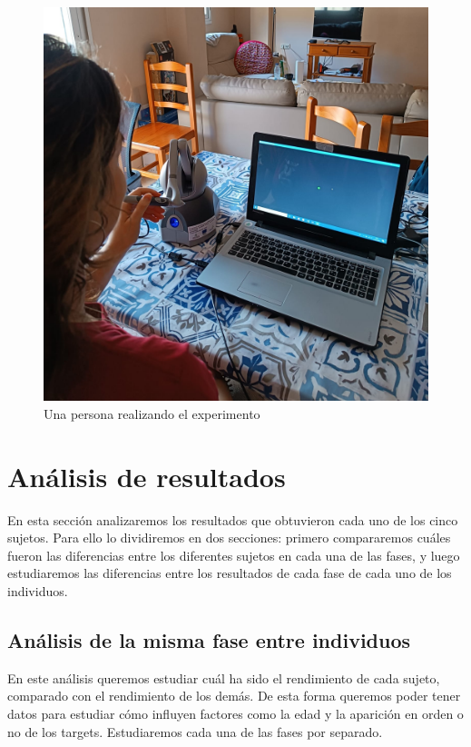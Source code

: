 \documentclass[a4paper,11pt, oneside]{book}
\begin{document}
\begin{figure}[H]
	\centering
	\includegraphics[width=\linewidth]{sujeto-2}
	\caption{Una persona realizando el experimento}
	\label{fig:persona}
\end{figure}


\section{Análisis de resultados} \label{seccion:analisis}


En esta sección analizaremos los resultados que obtuvieron cada uno de los cinco sujetos. Para ello lo dividiremos en dos secciones: primero compararemos cuáles fueron las diferencias entre los diferentes sujetos en cada una de las fases, y luego estudiaremos las diferencias entre los resultados de cada fase de cada uno de los individuos.


\subsection{Análisis de la misma fase entre individuos}

En este análisis queremos estudiar cuál ha sido el rendimiento de cada sujeto, comparado con el rendimiento de los demás. De esta forma queremos poder tener datos para estudiar cómo influyen factores como la edad y la aparición en orden o no de los targets. Estudiaremos cada una de las fases por separado.
\end{document}
